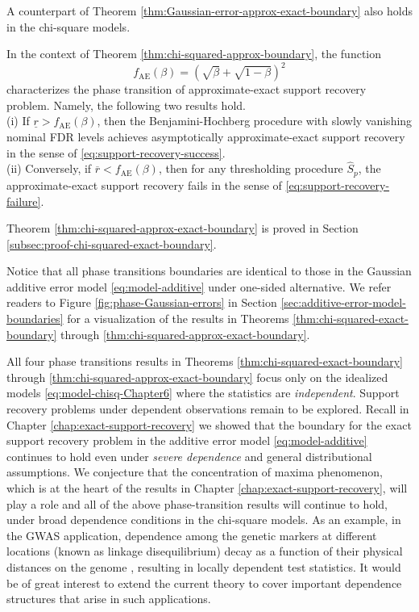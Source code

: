 A counterpart of Theorem \ref{thm:Gaussian-error-approx-exact-boundary} also holds in the chi-square models.

\begin{theorem} \label{thm:chi-squared-approx-exact-boundary}
In the context of Theorem \ref{thm:chi-squared-approx-boundary}, the function 
\begin{equation} \label{eq:approx-exact-boundary-chisquared}
    f_{\mathrm{AE}}(\beta) = \left(\sqrt{\beta} + \sqrt{1-\beta}\right)^2
\end{equation}
characterizes the phase transition of approximate-exact support recovery problem. Namely, 
the following two results hold.\\

{\rm (i)} If $\underline{r} > f_{\mathrm{AE}}(\beta)$, then the Benjamini-Hochberg procedure with slowly vanishing nominal FDR levels achieves asymptotically approximate-exact support recovery in the sense of \eqref{eq:support-recovery-success}. \\

{\rm (ii)} Conversely, if $\overline{r} < f_{\mathrm{AE}}(\beta)$, then for any thresholding procedure $\widehat{S}_p$, the approximate-exact support recovery fails in the sense of \eqref{eq:support-recovery-failure}.
\end{theorem}

Theorem \ref{thm:chi-squared-approx-exact-boundary} is proved in Section \ref{subsec:proof-chi-squared-exact-boundary}. 

Notice that all phase transitions boundaries are identical to those in the Gaussian additive error model \eqref{eq:model-additive} under one-sided alternative.
We refer readers to Figure \ref{fig:phase-Gaussian-errors} in Section \ref{sec:additive-error-model-boundaries} for a visualization of the results in Theorems \ref{thm:chi-squared-exact-boundary} through \ref{thm:chi-squared-approx-exact-boundary}.

\medskip

All four phase transitions results in Theorems \ref{thm:chi-squared-exact-boundary} through \ref{thm:chi-squared-approx-exact-boundary} 
focus only on the idealized models \eqref{eq:model-chisq-Chapter6} where the statistics are \emph{independent}.
Support recovery problems under dependent observations remain to be explored.
Recall in Chapter \ref{chap:exact-support-recovery} we showed that the boundary for the exact support recovery problem in the additive error model 
\eqref{eq:model-additive} continues to hold even under {\em severe dependence} and general distributional assumptions.
We conjecture that the concentration of maxima phenomenon, which is at the heart of the results in Chapter \ref{chap:exact-support-recovery}, will play
a role and all of the above phase-transition results will continue to hold, under broad dependence conditions in the chi-square models. As an example, 
in the GWAS application, dependence among the genetic markers at different locations (known as linkage disequilibrium) decay as a function of their physical distances on the genome \citep{bush2012genome}, resulting in locally dependent test statistics.
It would be of great interest to extend the current theory to cover important dependence structures that arise in such applications.


